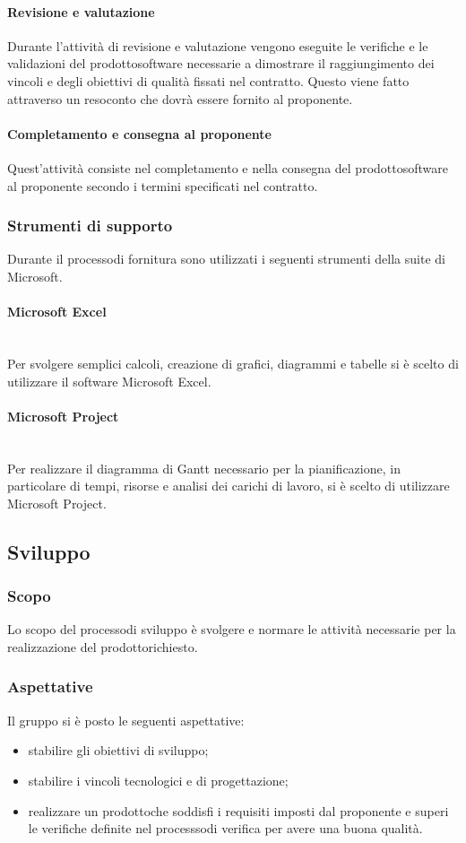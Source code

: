 			\paragraph{Revisione e valutazione}
				Durante l'attività di revisione e valutazione vengono eseguite le verifiche e le validazioni del prodotto\glosp software necessarie a dimostrare il raggiungimento dei vincoli e degli obiettivi di qualità fissati nel contratto. Questo viene fatto attraverso un resoconto che dovrà essere fornito al proponente.
			\paragraph{Completamento e consegna al proponente}
				Quest'attività consiste nel completamento e nella consegna del prodotto\glosp software al proponente secondo i termini specificati nel contratto. 
		\subsubsection{Strumenti di supporto}
		Durante il processo\glosp di fornitura sono utilizzati i seguenti strumenti della suite di Microsoft.
			\paragraph{Microsoft Excel}\mbox{}\\ [1mm]
			Per svolgere semplici calcoli, creazione di grafici, diagrammi e tabelle si è scelto di utilizzare il software Microsoft Excel.
			\paragraph{Microsoft Project}\mbox{}\\ [1mm]
			Per realizzare il diagramma di Gantt necessario per la pianificazione, in particolare di tempi, risorse e analisi dei carichi di lavoro, si è scelto di utilizzare Microsoft Project.
	\subsection{Sviluppo}
		\subsubsection{Scopo}
		Lo scopo del processo\glosp di sviluppo è svolgere e normare le attività necessarie per la realizzazione del prodotto\glosp richiesto.
		\subsubsection{Aspettative}
		Il gruppo si è posto le seguenti aspettative:
		\begin{itemize}
			\item stabilire gli obiettivi di sviluppo;
			\item stabilire i vincoli tecnologici e di progettazione\glo;
			\item realizzare un prodotto\glosp che soddisfi i requisiti imposti dal proponente e superi le verifiche definite nel processso\glosp di verifica per avere una buona qualità.
		\end{itemize}

